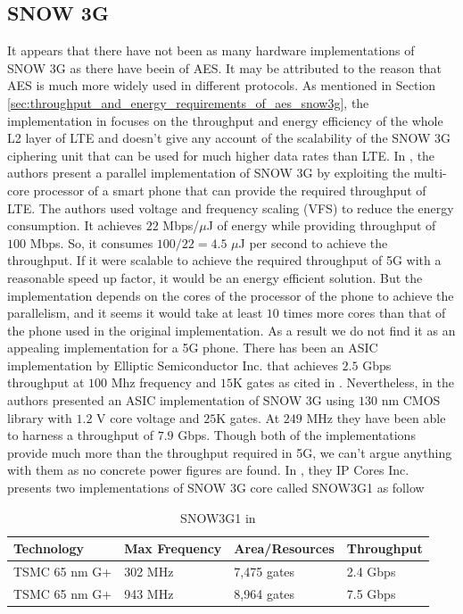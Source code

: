 \documentclass[lnicst,sechang,a4paper]{svmultln}
\begin{document}
\subsection{SNOW 3G}
\label{sub-sec:snow3gp}
It appears that there have not been as many hardware implementations of SNOW 3G as there have beein of AES. It may be attributed to the reason that AES is much more widely used in different protocols. As mentioned in Section \ref{sec:throughput_and_energy_requirements_of_aes_snow3g}, the implementation in \cite{IIS_Ruhr_2010} focuses on the throughput and energy efficiency of the whole L2 layer of LTE and doesn't give any account of the scalability of the SNOW 3G ciphering unit that can be used for much higher data rates than LTE. In \cite{IEEE_ICCT_2010}, the authors present a parallel implementation of SNOW 3G by exploiting the multi-core processor of a smart phone that can provide the required throughput of LTE. The authors used voltage and frequency scaling (VFS) to reduce the energy consumption. It achieves $22$ Mbps/$\mu$J of energy while providing throughput of $100$ Mbps. So, it consumes $100/22 = 4.5$ $\mu$J per second to achieve the throughput. If it were scalable to achieve the required throughput of 5G with a reasonable speed up factor, it would be an energy efficient solution. But the implementation depends on the cores of the processor of the phone to achieve the parallelism, and it seems it would take at least $10$ times more cores than that of the phone used in the original implementation. As a result we do not find it as an appealing implementation for a 5G phone. There has been an ASIC implementation by Elliptic Semiconductor Inc. that achieves $2.5$ Gbps throughput at $100$ Mhz frequency and $15$K gates as cited in \cite{Greece_SNOW3G}. Nevertheless, in \cite{Greece_SNOW3G} the authors presented an ASIC implementation of SNOW 3G using $130$ nm CMOS library with $1.2$ V core voltage and $25$K gates. At $249$ MHz they have been able to harness a throughput of $7.9$ Gbps. Though both of the implementations provide much more than the throughput required in 5G, we can't argue anything with them as no concrete power figures are found. In \cite{IP_cores}, they IP Cores Inc. presents two implementations of SNOW 3G core called SNOW3G1 as follow


\begin{table}
\begin{center}
\begin{tabular}{|p{}
				|p{}
				|p{}
				|p{}|				
				}
\hline
Technology & Max Frequency & Area/Resources & Throughput \\
\hline
TSMC 65 nm G+ & 302 MHz & 7,475 gates & 2.4 Gbps \\ \hline
TSMC 65 nm G+ & 943 MHz & 8,964 gates & 7.5 Gbps \\ \hline
\end{tabular}
\end{center}
\caption{SNOW3G1 in \cite{IP_cores}}
\label{table:aes_implementation}
\end{table}
\end{document}
